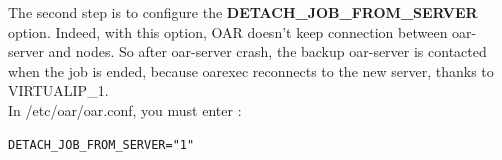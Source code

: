 \documentclass[a4paper,10pt]{report}
\begin{document}
The second step is to configure the \textbf{DETACH\_JOB\_FROM\_SERVER} option. Indeed, with this option, OAR doesn't keep connection between oar-server and nodes.
So after oar-server crash, the backup oar-server is contacted when the job is ended, because oarexec reconnects to the new server, thanks to VIRTUALIP\_1.\\
In /etc/oar/oar.conf, you must enter :
\begin{lstlisting}
DETACH_JOB_FROM_SERVER="1"
\end{lstlisting}





\begin{figure}[!h]
  \centering

\end{figure}
\end{document}
